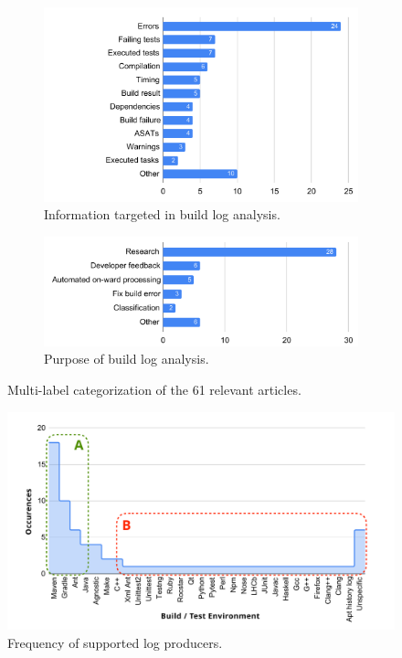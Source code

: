 \begin{figure}
\centering
\begin{subfigure}[t]{\columnwidth}
		\centering
		\includegraphics[width=\columnwidth,
		clip]{img/lit-sur/info_target.pdf}
		\caption{Information targeted in build log analysis.}
		\label{fig:litsur:info_target}

\end{subfigure}\hspace{\fill}
\begin{subfigure}[t]{\columnwidth}
		\centering
				\includegraphics[width=\columnwidth,
				clip]{img/lit-sur/use.pdf}
		\caption{Purpose of build log analysis.}
		\label{fig:litsur:use}

\end{subfigure}

\caption{Multi-label categorization of the 61 relevant articles.}
\end{figure}

\begin{figure}[tbhp]
		\centering
		\includegraphics[width=\columnwidth, trim={1.1cm 0.4cm
		1.5cm 0.5cm},
		clip]{img/lit-sur/log_producer_annotated.pdf}
		\caption{Frequency of supported log producers.}
		\label{fig:litsur:log_producer}
\end{figure}

